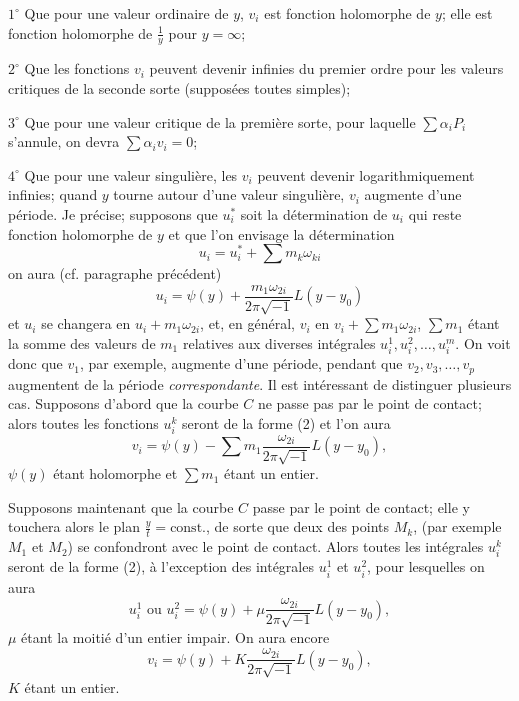 \documentclass{article}
\begin{document}
$1^{\circ}$ Que pour une valeur ordinaire de $y$, $v_{i}$ est fonction holomorphe de $y$; elle est fonction holomorphe de $\frac{1}{y}$ pour $y = \infty$;

$2^{\circ}$ Que les fonctions $v_{i}$ peuvent devenir infinies du premier ordre pour les valeurs critiques de la seconde sorte (supposées toutes simples);

$3^{\circ}$ Que pour une valeur critique de la première sorte, pour laquelle $\displaystyle\sum \alpha_{i} P_{i}$ s'annule, on devra $\displaystyle\sum \alpha_{i} v_{i} = 0$;

$4^{\circ}$ Que pour une valeur singulière, les $v_{i}$ peuvent devenir logarithmiquement infinies; quand $y$ tourne autour d'une valeur singulière, $v_{i}$ augmente d'une période. Je précise; supposons que $u_{i}^{*}$ soit la détermination de $u_{i}$ qui reste fonction holomorphe de $y$ et que l'on envisage la détermination
\[
u_{i} = u_{i}^{*} + \sum m_{k} \omega_{ki}
\]
on aura (cf. paragraphe précédent)
\[
u_{i} = \psi(y) + \frac{m_{1}\omega_{2i}}{2\pi\sqrt{-1}} L(y - y_{0}) \tag{2}
\]
et $u_{i}$ se changera en $u_{i} + m_{1}\omega_{2i}$, et, en général, $v_{i}$ en $v_{i} + \displaystyle\sum m_{1}\omega_{2i}$, $\displaystyle\sum m_{1}$ étant la somme des valeurs de $m_{1}$ relatives aux diverses intégrales $u_{i}^{1}, u_{i}^{2}, \ldots, u_{i}^{m}$. On voit donc que $v_{1}$, par exemple, augmente d'une période, pendant que $v_{2}, v_{3}, \ldots, v_{p}$ augmentent de la période \emph{correspondante}.
Il est intéressant de distinguer plusieurs cas. Supposons d'abord que la courbe $C$ ne passe pas par le point de contact; alors toutes les fonctions $u_{i}^{k}$ seront de la forme (2) et l'on aura
\[
v_{i} = \psi(y) - \sum m_{1} \frac{\omega_{2i}}{2\pi\sqrt{-1}} L(y - y_{0}),
\]
$\psi(y)$ étant holomorphe et $\displaystyle\sum m_{1}$ étant un entier.

Supposons maintenant que la courbe $C$ passe par le point de contact; elle y touchera alors le plan $\frac{y}{t} = \text{const.}$, de sorte que deux des points $M_{k}$, (par exemple $M_{1}$ et $M_{2}$) se confondront avec le point de contact. Alors toutes les intégrales $u_{i}^{k}$ seront de la forme (2), à l'exception des intégrales $u_{i}^{1}$ et $u_{i}^{2}$, pour lesquelles on aura
\[
u_{i}^{1} \text{ ou } u_{i}^{2} = \psi(y) + \mu \frac{\omega_{2i}}{2\pi\sqrt{-1}} L(y - y_{0}),
\]
$\mu$ étant la moitié d'un entier impair. On aura encore
\[
v_{i} = \psi(y) + K \frac{\omega_{2i}}{2\pi\sqrt{-1}} L(y - y_{0}),
\]
$K$ étant un entier.
\end{document}
